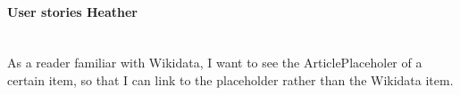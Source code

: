 \paragraph{User stories Heather} ~\\
As a reader familiar with Wikidata, I want to see the ArticlePlaceholer of a certain item, so that I can link to the placeholder rather than the Wikidata item. \\
